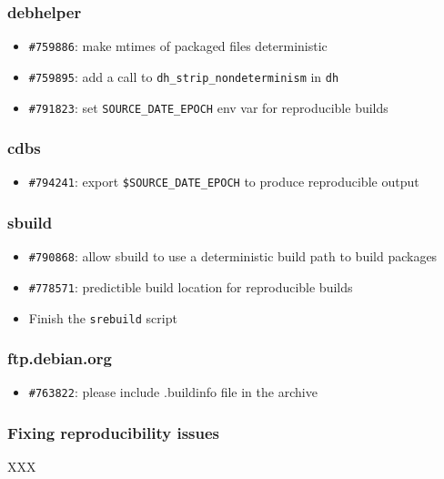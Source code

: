 \documentclass[14pt]{beamer}
\begin{document}
\begin{frame}
 \frametitle{debhelper}

 \begin{itemize}\small
  \item \texttt{\#759886}: make mtimes of packaged files deterministic
  \item \texttt{\#759895}: add a call to \texttt{dh\_strip\_nondeterminism} in \texttt{dh}
  \item \texttt{\#791823}: set \texttt{SOURCE\_DATE\_EPOCH} env var for reproducible builds
 \end{itemize}
\end{frame}

\begin{frame}
 \frametitle{cdbs}

 \begin{itemize}\small
  \item \texttt{\#794241}: export \texttt{\$SOURCE\_DATE\_EPOCH} to produce reproducible output
 \end{itemize}
\end{frame}

\begin{frame}
 \frametitle{sbuild}

 \begin{itemize}\small
  \item \texttt{\#790868}: allow sbuild to use a deterministic build path to build packages
  \item \texttt{\#778571}: predictible build location for reproducible builds
  \item Finish the \texttt{srebuild} script
 \end{itemize}
\end{frame}

\begin{frame}
 \frametitle{ftp.debian.org}

 \begin{itemize}\small
  \item \texttt{\#763822}: please include .buildinfo file in the archive
 \end{itemize}
\end{frame}

\begin{frame}
 \frametitle{Fixing reproducibility issues}

 XXX
\end{frame}
\end{document}
